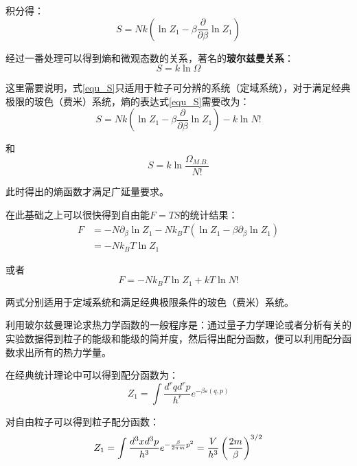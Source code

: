 \documentclass[UTF8]{ctexart}
\begin{document}
\noindent 积分得：
	\begin{equation}
		S=Nk\left(\ln Z_{1}-\beta \frac{\partial}{\partial \beta} \ln Z_{1}\right)\label{equ_S}
	\end{equation}
	
	经过一番处理可以得到熵和微观态数的关系，著名的\textbf{玻尔兹曼关系}：
	\begin{equation}
		S=k\ln \Omega
	\end{equation}
	
	这里需要说明，式\ref{equ_S}只适用于粒子可分辨的系统（定域系统），对于满足经典极限的玻色（费米）系统，熵的表达式\ref{equ_S}需要改为：
	\begin{equation}
		S=Nk\left(\ln Z_{1}-\beta \frac{\partial}{\partial \beta} \ln Z_{1}\right)-k\ln N!
	\end{equation}
	
\noindent 和
	\begin{equation}
		S=k\ln \frac{\Omega_{M.B.}}{N!}
	\end{equation}
	
\noindent 此时得出的熵函数才满足广延量要求。

	在此基础之上可以很快得到自由能$ F=TS $的统计结果：
	\begin{equation}
	\begin{aligned}
		F&=-N \partial_{\beta} \ln Z_{1}-N k_{B} T\left(\ln Z_{1}-\beta \partial_{\beta} \ln Z_{1}\right)\\
		&=-N k_{B} T \ln Z_{1}
	\end{aligned}
	\end{equation}
	
\noindent 或者
	\begin{equation}
		F=-N k_{B} T \ln Z_{1}+kT\ln N!
	\end{equation}

\noindent 两式分别适用于定域系统和满足经典极限条件的玻色（费米）系统。

	利用玻尔兹曼理论求热力学函数的一般程序是：通过量子力学理论或者分析有关的实验数据得到粒子的能级和能级的简并度，然后得出配分函数，便可以利用配分函数求出所有的热力学量。
	
	在经典统计理论中可以得到配分函数为：
	\begin{equation}
	Z_{1}=\int \frac{d^{r} q d^{r} p}{h^{r}} e^{-\beta \varepsilon(q, p)}
	\end{equation}
	
	对自由粒子可以得到粒子配分函数：
	\begin{equation}
	Z_{1}=\int \frac{d^{3} x d^{3} p}{h^{3}} e^{-\frac{\beta}{2 \pi m} p^{2}}=\frac{V}{h^{3}}\left(\frac{2 m}{\beta}\right)^{3 / 2}\label{equ_Z_{1}}
	\end{equation}
	
\end{document}
